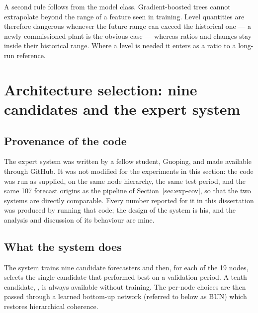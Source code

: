 A second rule follows from the model class. Gradient-boosted trees cannot extrapolate
beyond the range of a feature seen in training. Level quantities are therefore dangerous
whenever the future range can exceed the historical one --- a newly commissioned plant is
the obvious case --- whereas ratios and changes stay inside their historical range. Where
a level is needed it enters as a ratio to a long-run reference.

\section{Architecture selection: nine candidates and the expert system}
\label{sec:exp-arch}

\subsection{Provenance of the code}

The expert system was written by a fellow student, Guoping, and made available through
GitHub. It was not modified for the experiments in this section: the code was run as
supplied, on the same node hierarchy, the same test period, and the same 107 forecast
origins as the pipeline of Section~\ref{sec:exp-cov}, so that the two systems are directly
comparable. Every number reported for it in this dissertation was produced by running that
code; the design of the system is his, and the analysis and discussion of its behaviour
are mine.

\subsection{What the system does}

The system trains nine candidate forecasters and then, for each of the 19 nodes, selects
the single candidate that performed best on a validation period. A tenth candidate,
\naiveA{}, is always available without training. The per-node choices are then passed
through a learned bottom-up network (referred to below as BUN) which restores hierarchical
coherence.

